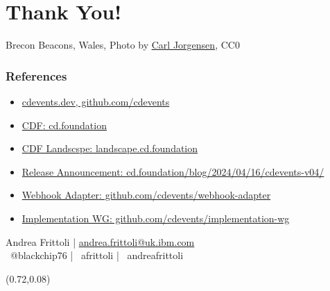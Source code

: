 \documentclass[aspectratio=169,11pt,hyperref={colorlinks=true}]{beamer}
\begin{document}
\section[Thank You]{Thank You!}

\begin{sectionwithpiclargecentral}{Brecon Beacons, Wales, Photo by \href{https://unsplash.com/@scamartist}{\underline{Carl Jorgensen}}, CC0}
\end{sectionwithpiclargecentral}

\begin{blackframe}
  \frametitle{References}
  \begin{itemize}
    \item \href{https://cdevents.dev}{cdevents.dev, github.com/cdevents}
    \item \href{https://cd.foundation}{CDF: cd.foundation}
    \item \href{https://landscape.cd.foundation}{CDF Landscspe: landscape.cd.foundation}
  \end{itemize}
  \vspace{0.06\textheight}
  \begin{itemize}
    \item \href{https://cd.foundation/blog/2024/04/16/cdevents-v04/}{Release Announcement: cd.foundation/blog/2024/04/16/cdevents-v04/}
    \item \href{https://github.com/cdevents/webhook-adapter/}{Webhook Adapter: github.com/cdevents/webhook-adapter}
    \item \href{https://github.com/cdevents/implementation-wg}{Implementation WG: github.com/cdevents/implementation-wg}
  \end{itemize}
  \vspace{0.1\textheight}
  Andrea Frittoli | \href{mailto:andrea.frittoli@uk.ibm.com}{andrea.frittoli@uk.ibm.com} \\
  \faTwitter ~@blackchip76 | \faGithub ~afrittoli | \faLinkedin ~andreafrittoli
  \begin{textblock*}{0.20\paperwidth}(0.72\paperwidth,0.08\paperheight)

\end{textblock*}
\end{blackframe}
\end{document}
